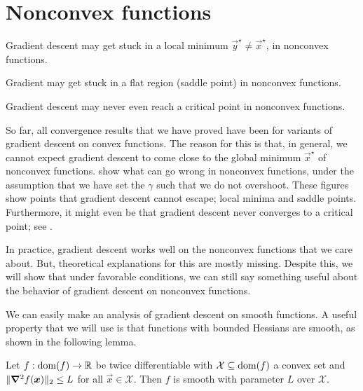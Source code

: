 \section{Nonconvex functions}

\begin{marginfigure}
    \centering
    \caption{Gradient descent may get stuck in a local minimum $\vec{y}^\star \neq \vec{x}^\star$, in nonconvex functions.}
    \label{fig:local-minimum}
\end{marginfigure}

\begin{marginfigure}
    \centering
    \caption{Gradient may get stuck in a flat region (saddle point) in nonconvex functions.}
    \label{fig:saddle-point}
\end{marginfigure}

\begin{marginfigure}
    \centering
    \caption{Gradient descent may never even reach a critical point in nonconvex functions.}
    \label{fig:no-critical-point}
\end{marginfigure}

So far, all convergence results that we have proved have been for variants of gradient descent on
convex functions. The reason for this is that, in general, we cannot expect gradient descent to
come close to the global minimum $\vec{x}^\star$ of nonconvex functions.
 show what can go wrong in nonconvex
functions, under the assumption that we have set the $\gamma$ such that we do not overshoot. These
figures show points that gradient descent cannot escape; local minima and saddle points.
Furthermore, it might even be that gradient descent never converges to a critical point; see
.

In practice, gradient descent works well on the nonconvex functions that we care about. But,
theoretical explanations for this are mostly missing. Despite this, we will show that under
favorable conditions, we can still say something useful about the behavior of gradient descent on
nonconvex functions.

We can easily make an analysis of gradient descent on smooth functions. A useful property that we
will use is that functions with bounded Hessians are smooth, as shown in the following lemma.

\begin{lemma}
    Let $f: \mathrm{dom}(f) \to \mathbb{R}$ be twice differentiable with $\mathcal{X} \subseteq \mathrm{dom}(f)$ a convex set and
    $\| \bm{\nabla}^2_{\! } f(\bm{x}) \|_2 \leq L$ for all $\vec{x} \in \mathcal{X}$. Then $f$ is smooth with
    parameter $L$ over $\mathcal{X}$.
\end{lemma}

